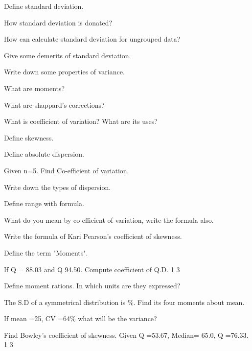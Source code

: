 \documentclass[11pt,a4paper]{article}
\begin{document}
\begin{shortlist}
\item Define standard deviation.

\item How standard deviation is donated?

\item How can calculate standard deviation for ungrouped data?

\item Give some demerits of standard deviation.

\item Write down some properties of variance.

\item What are moments?

\item What are shappard's corrections?

\item What is coefficient of variation? What are its uses?

\item Define skewness.

\item Define absolute dispersion.

\item Given n=5. Find Co-efficient of variation.

\item Write down the types of dispersion.

\item Define range with formula.

\item What do you mean by co-efficient of variation, write the formula also.

\item Write the formula of Kari Pearson's coefficient of skewness.

\item Define the term "Moments".

\item If Q = 88.03 and Q 94.50. Compute coefficient of Q.D. 1 3

\item Define moment rations. In which units are they expressed?

\item The S.D of a symmetrical distribution is \%. Find its four moments about mean.

\item If mean =25, CV =64\% what will be the variance?

\item Find Bowley's coefficient of skewness. Given Q =53.67, Median= 65.0, Q =76.33. 1 3


\end{shortlist}
\end{document}
